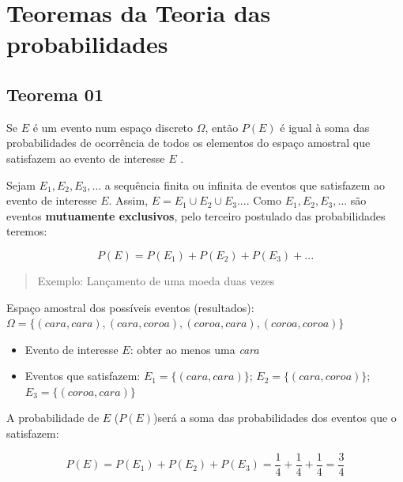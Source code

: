 \documentclass[
]{book}
\providecommand{\tightlist}{%
  \setlength{\itemsep}{0pt}\setlength{\parskip}{0pt}}
\begin{document}
\hypertarget{teoremas-da-teoria-das-probabilidades}{%
\section{Teoremas da Teoria das probabilidades}\label{teoremas-da-teoria-das-probabilidades}}

\hypertarget{teorema-01}{%
\subsection{Teorema 01}\label{teorema-01}}

Se \(E\) é um evento num espaço discreto \(\Omega\), então \(P(E)\) é igual à soma das probabilidades de ocorrência de todos os elementos do espaço amostral que satisfazem ao evento de interesse \(E\) .

\hfill\break

Sejam \(E_{1},E_{2},E_{3},\dots\) a sequência finita ou infinita de eventos que satisfazem ao evento de interesse \(E\). Assim, \(E = E_{1} \cup E_{2} \cup E_{3}...\). Como \(E_{1},E_{2},E_{3},\dots\) são eventos \textbf{mutuamente exclusivos}, pelo terceiro postulado das probabilidades teremos:

\hfill\break

\[
P(E) = P(E_{1}) + P(E_{2}) + P(E_{3}) + ...
\]

\hfill\break

\begin{quote}
Exemplo: Lançamento de uma moeda duas vezes
\end{quote}

\hfill\break

Espaço amostral dos possíveis eventos (resultados): \(\Omega = \{(cara, cara), (cara, coroa), (coroa, cara), (coroa, coroa)\}\)

\begin{itemize}
\tightlist
\item
  Evento de interesse \(E\): obter ao menos uma \emph{cara}
\item
  Eventos que satisfazem: \(E_{1} =\{(cara, cara)\}\); \(E_{2} =\{(cara, coroa)\}\); \(E_{3} =\{(coroa, cara)\}\)
\end{itemize}

A probabilidade de \(E\) (\(P(E)\))será a soma das probabilidades dos eventos que o satisfazem:

\[
P(E) = P(E_{1}) + P(E_{2}) + P(E_{3}) = \frac{1}{4} + \frac{1}{4} + \frac{1}{4} = \frac{3}{4}
\]

\hfill\break
\end{document}
